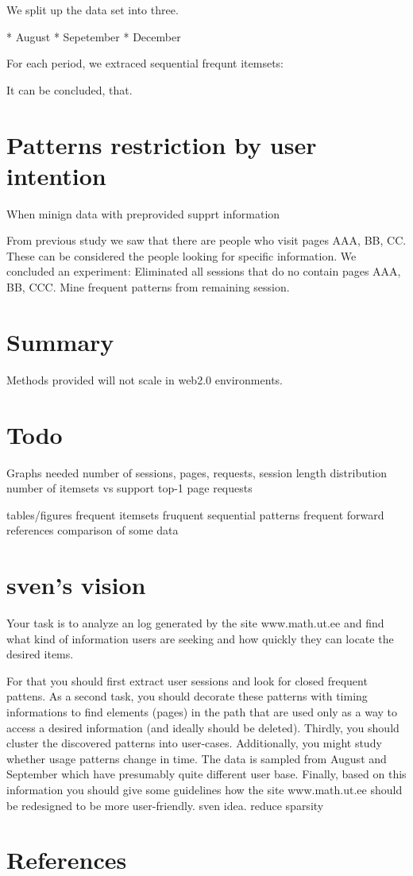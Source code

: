 \documentclass[english,a4paper]{article}
\begin{document}
We split up the data set into three.

* August
* Sepetember
* December

For each period, we extraced sequential frequnt itemsets:




It can be concluded, that.


\section{Patterns restriction by user intention}
When minign data with preprovided supprt information

From previous study we saw that there are people who visit pages AAA, BB, CC. These can be considered the people looking for specific information. We concluded an experiment:
Eliminated all sessions that do no contain pages AAA, BB, CCC.
Mine frequent patterns from remaining session.

\section{Summary}
Methods provided will not scale in web2.0 environments.

\section{Todo}
Graphs needed
number of sessions, pages, requests, session length distribution
number of itemsets vs support
top-1 page requests

tables/figures
frequent itemsets
fruquent sequential patterns
frequent forward references
comparison of some data

\section{sven's vision}
Your task is to analyze an log generated by the site www.math.ut.ee and find what kind of information users are seeking and how quickly they can locate the desired items. 

For that you should first extract user sessions and look for closed frequent pattens.
As a second task, you should decorate these patterns with timing informations to find elements (pages) in the path that are used only as a way to access a desired information (and ideally should be deleted).
Thirdly, you should cluster the discovered patterns into user-cases.
Additionally, you might study whether usage patterns change in time.
 The data is sampled from August and September which have presumably quite different user base.
 Finally, based on this information you should give some guidelines how the site www.math.ut.ee should be redesigned to be more user-friendly.
 sven idea. reduce sparsity


\section*{References}


\end{document}
